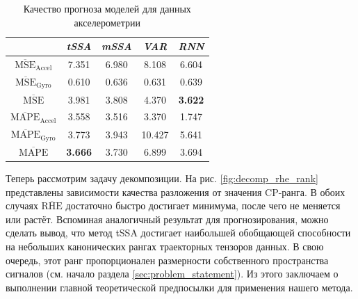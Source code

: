 			\def\arraystretch{1.1}
			\begin{table}[h]
				\centering
				\caption{Качество прогноза моделей для данных акселерометрии}\label{tab:pred_res_motion}
				\begin{tabular}{|c|c|c|c|c|}
					\hline
					& \textit{tSSA}                & \textit{mSSA} & \textit{VAR} & \textit{RNN} \\ \hline
					$ \overline{\text{MSE}}_{\text{Accel}} $  & 7.351          & 6.980 & 8.108  & 6.604          \\ \hline
					$ \overline{\text{MSE}}_{\text{Gyro}} $   & 0.610          & 0.636 & 0.631  & 0.639          \\ \hline
					$ \overline{\text{MSE}} $         & 3.981          & 3.808 & 4.370  & \textbf{3.622} \\ \hline
					$ \overline{\text{MAPE}}_{\text{Accel}} $ & 3.558          & 3.516 & 3.370  & 1.747          \\ \hline
					$ \overline{\text{MAPE}}_{\text{Gyro}} $  & 3.773          & 3.943 & 10.427 & 5.641          \\ \hline
					$ \overline{\text{MAPE}} $        & \textbf{3.666} & 3.730 & 6.899  & 3.694          \\ \hline
				\end{tabular}
			\end{table}
			
			Теперь рассмотрим задачу декомпозиции. На рис. \ref{fig:decomp_rhe_rank} представлены зависимости качества разложения от значения CP-ранга. В обоих случаях $ \overline{\text{RHE}} $ достаточно быстро достигает минимума, после чего не меняется или растёт. Вспоминая аналогичный результат для прогнозирования, можно сделать вывод, что метод tSSA достигает наибольшей обобщающей способности на небольших канонических рангах траекторных тензоров данных. В свою очередь, этот ранг пропорционален размерности собственного пространства сигналов (см. начало раздела \ref{sec:problem_statement}). Из этого заключаем о выполнении главной теоретической предпосылки для применения нашего метода.
			
